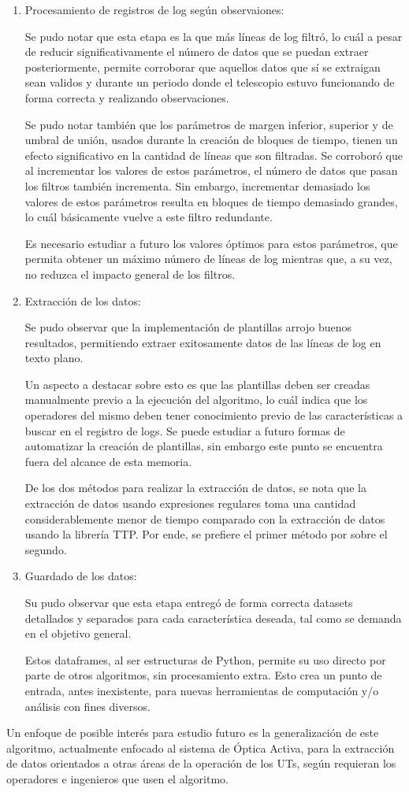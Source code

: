 \begin{enumerate}
    \item Procesamiento de registros de log según observaiones: 
    
    Se pudo notar que esta etapa es la que más líneas de log filtró, lo cuál a pesar de reducir significativamente el número de datos que se puedan extraer posteriormente, permite corroborar que aquellos datos que sí se extraigan sean validos y durante un periodo donde el telescopio estuvo funcionando de forma correcta y realizando observaciones. 
    
    Se pudo notar también que los parámetros de margen inferior, superior y de umbral de unión, usados durante la creación de bloques de tiempo, tienen un efecto significativo en la cantidad de líneas que son filtradas. Se corroboró que al incrementar los valores de estos parámetros, el número de datos que pasan los filtros también incrementa. Sin embargo, incrementar demasiado los valores de estos parámetros resulta en bloques de tiempo demasiado grandes, lo cuál básicamente vuelve a este filtro redundante. 
    
    Es necesario estudiar a futuro los valores óptimos para estos parámetros, que permita obtener un máximo número de líneas de log mientras que, a su vez, no reduzca el impacto general de los filtros.

    \item Extracción de los datos:

    Se pudo observar que la implementación de plantillas arrojo buenos resultados, permitiendo extraer exitosamente datos de las líneas de log en texto plano. 

    Un aspecto a destacar sobre esto es que las plantillas deben ser creadas manualmente previo a la ejecución del algoritmo, lo cuál indica que los operadores del mismo deben tener conocimiento previo de las características a buscar en el registro de logs. Se puede estudiar a futuro formas de automatizar la creación de plantillas, sin embargo este punto se encuentra fuera del alcance de esta memoria.

    De los dos métodos para realizar la extracción de datos, se nota que la extracción de datos usando expresiones regulares toma una cantidad considerablemente menor de tiempo comparado con la extracción de datos usando la librería TTP. Por ende, se prefiere el primer método por sobre el segundo.

    \item Guardado de los datos:

    Su pudo observar que esta etapa entregó de forma correcta datasets detallados y separados para cada característica deseada, tal como se demanda en el objetivo general. 

    Estos dataframes, al ser estructuras de Python, permite su uso directo por parte de otros algoritmos, sin procesamiento extra. Esto crea un punto de entrada, antes inexistente, para nuevas herramientas de computación y/o análisis con fines diversos.
    
\end{enumerate}

Un enfoque de posible interés para estudio futuro es la generalización de este algoritmo, actualmente enfocado al sistema de Óptica Activa, para la extracción de datos orientados a otras áreas de la operación de los UTs, según requieran los operadores e ingenieros que usen el algoritmo.
